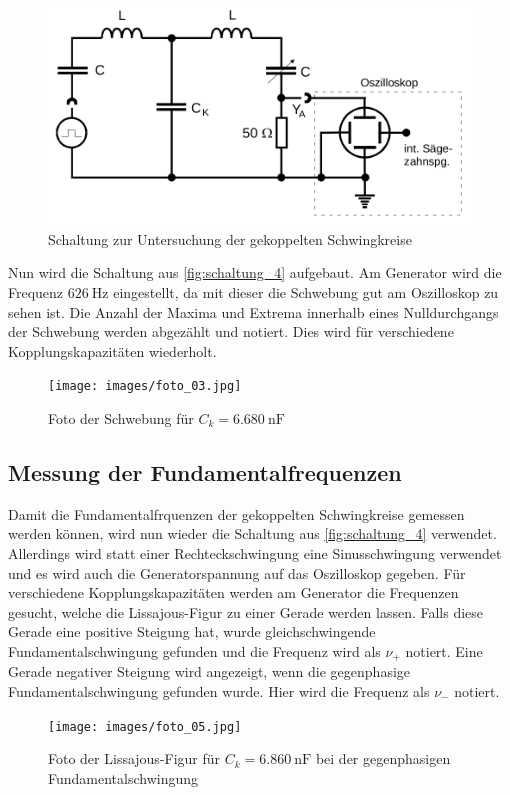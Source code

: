 \begin{figure}
    \centering
    \includegraphics[width=\textwidth/2]{images/schaltung_4.png}
    \caption{Schaltung zur Untersuchung der gekoppelten Schwingkreise\cite{V355}}
    \label{fig:schaltung_4}
\end{figure}

Nun wird die Schaltung aus \autoref{fig:schaltung_4} aufgebaut.
Am Generator wird die Frequenz $\SI{626}{\hertz}$ eingestellt, da mit dieser die Schwebung gut am Oszilloskop zu sehen ist. Die Anzahl der Maxima und Extrema innerhalb eines Nulldurchgangs der Schwebung werden abgezählt und notiert. 
Dies wird für verschiedene Kopplungskapazitäten wiederholt.

\begin{figure}
    \centering
    \texttt{[image: images/foto\_03.jpg]}
    \caption{Foto der Schwebung für $C_k = \SI{6.680}{\nano\farad}$}
    \label{fig:foto_03}
\end{figure}

\subsection{Messung der Fundamentalfrequenzen}
\label{sec:frequenzen}

Damit die Fundamentalfrquenzen der gekoppelten Schwingkreise gemessen werden können, wird nun wieder die Schaltung aus \autoref{fig:schaltung_4} verwendet.
Allerdings wird statt einer Rechteckschwingung eine Sinusschwingung verwendet und es wird auch die Generatorspannung auf das Oszilloskop gegeben.
Für verschiedene Kopplungskapazitäten werden am Generator die Frequenzen gesucht, welche die Lissajous-Figur zu einer Gerade werden lassen. 
Falls diese Gerade eine positive Steigung hat, wurde gleichschwingende Fundamentalschwingung gefunden und die Frequenz wird als $\nu _+$ notiert.
Eine Gerade negativer Steigung wird angezeigt, wenn die gegenphasige Fundamentalschwingung gefunden wurde. Hier wird die Frequenz als $\nu _-$ notiert.
\begin{figure}
    \centering
    \texttt{[image: images/foto\_05.jpg]}
    \caption{Foto der Lissajous-Figur für $C_k = \SI{6.860}{\nano\farad}$ bei der gegenphasigen Fundamentalschwingung}
    \label{fig:foto_05}
\end{figure}

